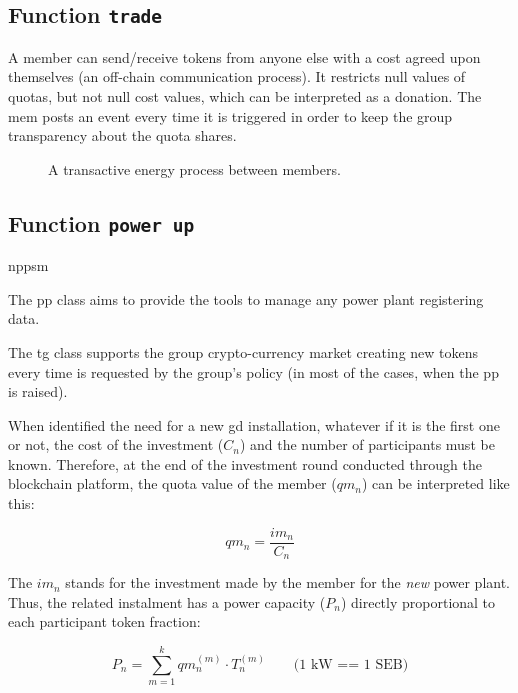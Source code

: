 \subsection*{Function \texttt{trade}}


A member can send/receive tokens from anyone else with a cost agreed upon themselves (an off-chain communication process).
It restricts null values of quotas, but not null cost values, which can be interpreted as a donation.
The \gls{mem} posts an event every time it is triggered in order to keep the group transparency about the quota shares.

\begin{figure}[h!tbp]{\textwidth}
    \centering
    \caption{A transactive energy process between members.}
    \frame{\resizebox{0.5\textwidth}{!}{}}
    \source{\copyright}
\end{figure}

\subsection*{Function \texttt{power up}}

\acrfull{nppsm}
 
The \gls{pp} class aims to provide the tools to manage any power plant registering data.

The \gls{tg} class supports the group crypto-currency market creating new tokens every time is requested by the group's policy (in most of the cases, when the \gls{pp} is raised).

When identified the need for a new \gls{gd} installation, whatever if it is the first one or not, the cost of the investment ($C_{n}$) and the number of participants must be known.
Therefore, at the end of the investment round conducted through the blockchain platform, the quota value of the member ($qm_{n}$) can be interpreted like this:

\begin{equation}
    qm_{n} = \frac{im_{n}}{C_{n}}
\end{equation}

The $im_{n}$ stands for the investment made by the member for the \textit{new} power plant.
Thus, the related instalment has a power capacity ($P_{n}$) directly proportional to each participant token fraction:

\begin{equation}
    P_{n} = \sum_{m=1}^{k} qm_{n}^{(m)} \cdot T_{n}^{(m)} \qquad \text{(1 kW == 1 SEB)} %
\end{equation}

